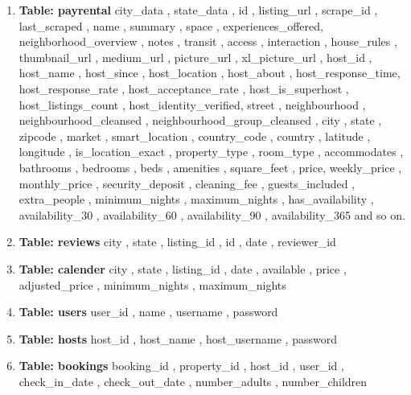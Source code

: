 \documentclass[10pt]{article}
\begin{document}
\begin{enumerate}
    \item \textbf{Table: payrental} 
    \newline
    city\_data , state\_data , id , listing\_url , scrape\_id , last\_scraped , name , summary , space , experiences\_offered, neighborhood\_overview , notes , transit , access , interaction , house\_rules , thumbnail\_url , medium\_url , picture\_url , xl\_picture\_url , host\_id , host\_name , host\_since , host\_location , host\_about , host\_response\_time, host\_response\_rate , host\_acceptance\_rate , host\_is\_superhost , host\_listings\_count , host\_identity\_verified, street , neighbourhood , neighbourhood\_cleansed , neighbourhood\_group\_cleansed , city , state , zipcode , market , smart\_location , country\_code , country , latitude , longitude , is\_location\_exact , property\_type , room\_type , accommodates , bathrooms , bedrooms , beds , amenities , square\_feet , price, weekly\_price , monthly\_price , security\_deposit , cleaning\_fee , guests\_included , extra\_people , minimum\_nights , maximum\_nights , has\_availability , availability\_30 , availability\_60 , availability\_90 , availability\_365 and so on.
    \item  \textbf{Table: reviews} 
    \newline
    city , state , listing\_id , id , date , reviewer\_id
    \item  \textbf{Table: calender} 
    \newline
    city , state , listing\_id , date , available , price , adjusted\_price , minimum\_nights , maximum\_nights
    \item \textbf{Table: users} 
    \newline
    user\_id , name , username , password
    \item \textbf{Table: hosts} 
    \newline
    host\_id , host\_name , host\_username , password
    \item  \textbf{Table: bookings} 
    \newline
    booking\_id , property\_id , host\_id , user\_id , check\_in\_date , check\_out\_date , number\_adults , number\_children
\end{enumerate}
\end{document}
